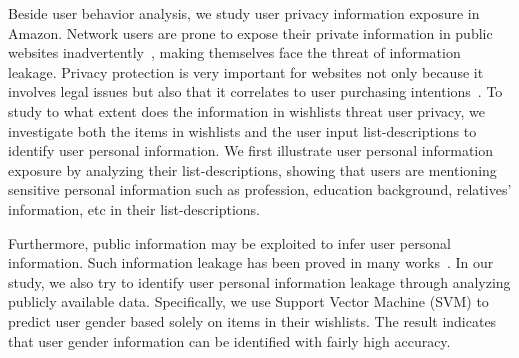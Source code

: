 Beside user behavior analysis, we study user privacy information exposure in Amazon. Network users are prone to expose their private information in public websites inadvertently~\cite{frankowski2006you, friedland2010cybercasing}, making themselves face the threat of information leakage. Privacy protection is very important for websites not only because it involves legal issues but also that it correlates to user purchasing intentions~\cite{brown2004investigating, tsai2011effect}. To study to what extent does the information in wishlists threat user privacy, we investigate both the items in wishlists and the user input list-descriptions to identify user personal information. We first illustrate user personal information exposure by analyzing their list-descriptions, showing that users are mentioning sensitive personal information such as profession, education background, relatives' information, etc in their list-descriptions. 

Furthermore, public information may be exploited to infer user personal information. Such information leakage has been proved in many works~\cite{narayanan2009anonymizing, wondracek2010practical, chaabane2012you, hecht2011tweets, goga2013exploiting}. In our study, we also try to identify user personal information leakage through analyzing publicly available data. Specifically, we use Support Vector Machine (SVM) to predict user gender based solely on items in their wishlists. The result indicates that user gender information can be identified with fairly high accuracy.  
